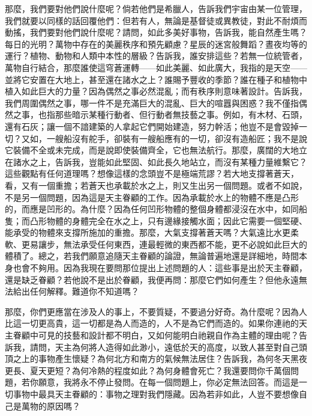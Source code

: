 那麼，我們要對他們說什麼呢？倘若他們是希臘人，告訴我們宇宙由某一位管理，我們就要以同樣的話回覆他們：但若有人，無論是基督徒或異教徒，對此不耐煩而動搖，我們要對他們說什麼呢？請問，如此多美好事物，告訴我，能自然產生嗎？每日的光明？萬物中存在的美麗秩序和預先顧慮？星辰的迷宮般舞蹈？晝夜均等的運行？植物、動物和人類中本性的層級？告訴我，誰安排這些？若無一位統管者，萬物自行結合，那麼誰使這穹蒼運轉——如此美麗、如此廣大，我指的是天空——並將它安置在大地上，甚至還在諸水之上？誰賜予豐收的季節？誰在種子和植物中植入如此巨大的力量？因為偶然之事必然混亂；而有秩序則意味著設計。告訴我，我們周圍偶然之事，哪一件不是充滿巨大的混亂、巨大的喧囂與困惑？我不僅指偶然之事，也指那些暗示某種行動者、但行動者無技藝之事。例如，有木材、石頭，還有石灰；讓一個不諳建築的人拿起它們開始建造，努力幹活；他豈不是會毀掉一切？又如，一艘船沒有舵手，卻裝有一艘船應有的一切，卻沒有造船匠；我不是說它裝備不全或未完成，而是說即使裝備齊全，它也無法航行。那麼，廣闊的大地立在諸水之上，告訴我，豈能如此堅固、如此長久地站立，而沒有某種力量維繫它？這些觀點有任何道理嗎？想像這樣的念頭豈不是極端荒謬？若大地支撐著蒼天，看，又有一個重擔；若蒼天也承載於水之上，則又生出另一個問題。或者不如說，不是另一個問題，因為這是天主眷顧的工作。因為承載於水上的物體不應是凸形的，而應是凹形的。為什麼？因為任何凹形物體的整個身體都浸沒在水中，如同船隻；而凸形物體的身體完全在水之上，只有邊緣接觸水面；因此它需要一個堅硬、能承受的物體來支撐所施加的重擔。那麼，大氣支撐著蒼天嗎？大氣遠比水更柔軟、更易讓步，無法承受任何東西，連最輕微的東西都不能，更不必說如此巨大的體積了。總之，若我們願意追隨天主眷顧的論證，無論普遍地還是詳細地，時間本身也會不夠用。因為我現在要問那位提出上述問題的人：這些事是出於天主眷顧，還是缺乏眷顧？若他說不是出於眷顧，我便再問：那麼它們如何產生？但他永遠無法給出任何解釋。難道你不知道嗎？\par

那麼，你們更應當在涉及人的事上，不要質疑，不要過分好奇。為什麼呢？因為人比這一切更高貴，這一切都是為人而造的，人不是為它們而造的。如果你連祂的天主眷顧中可見的技藝和設計都不明白，又如何能明白祂親自作為主體的理由呢？告訴我，請問，天主為何將人造得如此渺小，遠低於天的高度，以致人甚至對自己頭頂之上的事物產生懷疑？為何北方和南方的氣候無法居住？告訴我，為何冬天黑夜更長、夏天更短？為何冷熱的程度如此？為何身體會死亡？我還要問你千萬個問題，若你願意，我將永不停止發問。在每一個問題上，你必定無法回答。而這是一切事物中最具天主眷顧的：事物之理對我們隱藏。因為若非如此，人豈不要想像自己是萬物的原因嗎？\par

